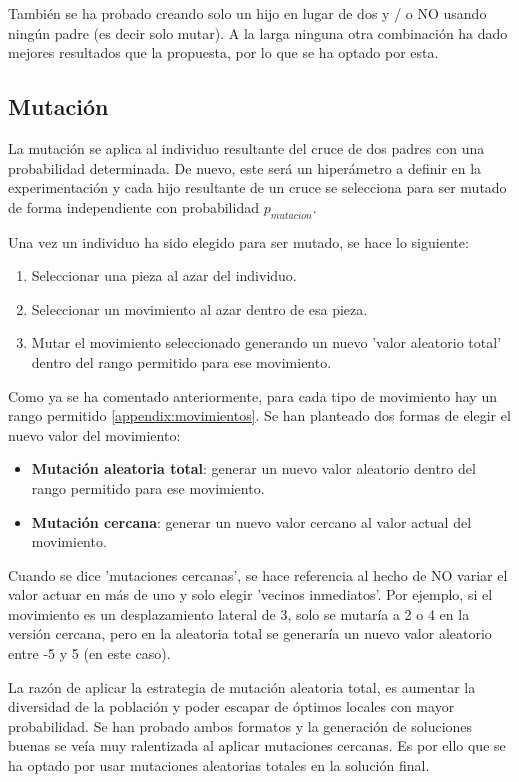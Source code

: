 \documentclass[11pt,spanish,listoffigures,listoftables]{tfgetsinf}
\begin{document}
También se ha probado creando solo un hijo en lugar de dos y / o NO usando ningún padre (es decir solo mutar). A la larga ninguna otra combinación ha dado mejores resultados que la propuesta, por lo que se ha optado por esta.

\subsection{Mutación}
La mutación se aplica al individuo resultante del cruce de dos padres con una probabilidad determinada. De nuevo, este será un hiperámetro a definir en la experimentación y cada hijo resultante de un cruce se selecciona para ser mutado de forma independiente con probabilidad $p_{mutacion}$.

Una vez un individuo ha sido elegido para ser mutado, se hace lo siguiente:
\begin{enumerate}
    \item Seleccionar una pieza al azar del individuo.
    \item Seleccionar un movimiento al azar dentro de esa pieza.
    \item Mutar el movimiento seleccionado generando un nuevo 'valor aleatorio total' dentro del rango permitido para ese movimiento.
\end{enumerate}

Como ya se ha comentado anteriormente, para cada tipo de movimiento hay un rango permitido \ref{appendix:movimientos}. Se han planteado dos formas de elegir el nuevo valor del movimiento:
\begin{itemize}
    \item \textbf{Mutación aleatoria total}: generar un nuevo valor aleatorio dentro del rango permitido para ese movimiento.
    \item \textbf{Mutación cercana}: generar un nuevo valor cercano al valor actual del movimiento.
\end{itemize}

Cuando se dice 'mutaciones cercanas', se hace referencia al hecho de NO variar el valor actuar en más de uno y solo elegir 'vecinos inmediatos'. Por ejemplo, si el movimiento es un desplazamiento lateral de 3, solo se mutaría a 2 o 4 en la versión cercana, pero en la aleatoria total se generaría un nuevo valor aleatorio entre -5 y 5 (en este caso).

La razón de aplicar la estrategia de mutación aleatoria total, es aumentar la diversidad de la población y poder escapar de óptimos locales con mayor probabilidad. Se han probado ambos formatos y la generación de soluciones buenas se veía muy ralentizada al aplicar mutaciones cercanas. Es por ello que se ha optado por usar mutaciones aleatorias totales en la solución final.
\end{document}

